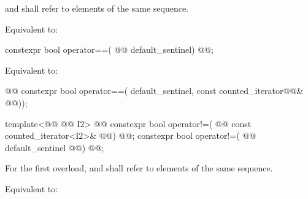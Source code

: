 \begin{addedblock}
\begin{itemdescr}
\pnum
\requires {} and  shall refer to elements of the same
sequence.

\pnum
\effects Equivalent to:
\end{itemdescr}

\begin{itemdecl}
constexpr bool operator==(
  @@ default_sentinel) @@;
\end{itemdecl}

\begin{itemdescr}
\pnum
\effects Equivalent to: 
\end{itemdescr}

\begin{itemdecl}
@@ constexpr bool operator==(
  default_sentinel, const counted_iterator@@& @@));
\end{itemdecl}

{\color{newclr}
\begin{itemdescr}
\pnum
{}
\end{itemdescr}
} %

%
%
\begin{itemdecl}
template<@@ @@ I2>
    @@
  constexpr bool operator!=(
    @@ const counted_iterator<I2>& @@) @@;
constexpr bool operator!=(
  @@ default_sentinel @@) @@;
\end{itemdecl}

\begin{itemdescr}
\pnum
\requires For the first overload,  and  shall refer to
elements of the same sequence.

\pnum
\effects Equivalent to:
\end{itemdescr}


\end{addedblock}
